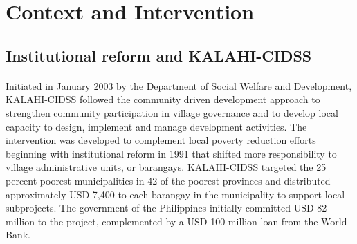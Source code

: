 \documentclass[12pt]{article}
\begin{document}




\section{Context and Intervention}

	\subsection{Institutional reform and KALAHI-CIDSS}

	\paragraph{ } Initiated in January 2003 by the Department of Social Welfare and Development, KALAHI-CIDSS followed the community driven development approach to strengthen community participation in village governance and to develop local capacity to design, implement and manage development activities. The intervention was developed to complement local poverty reduction efforts beginning with institutional reform in 1991 that shifted more responsibility to village administrative units, or barangays. KALAHI-CIDSS targeted the 25 percent poorest municipalities in 42 of the poorest provinces and distributed approximately USD 7,400 to each barangay in the municipality to support local subprojects. The government of the Philippines initially committed USD 82 million to the project, complemented by a USD 100 million loan from the World Bank. 
\end{document}
